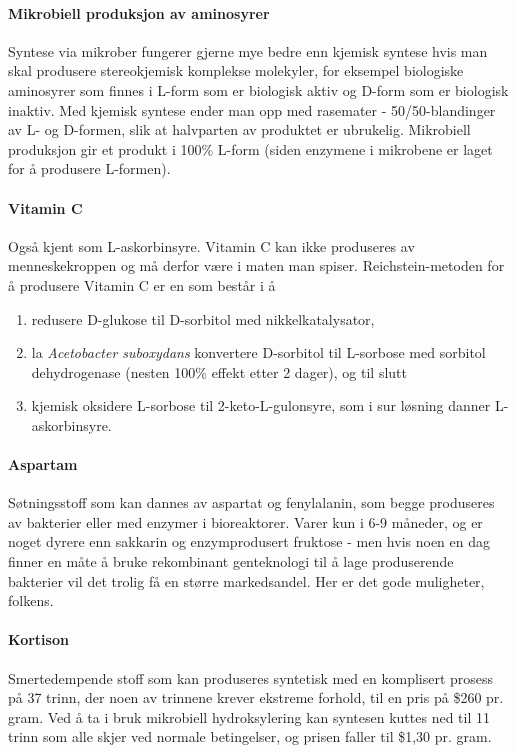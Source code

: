\paragraph{Mikrobiell produksjon av aminosyrer} Syntese via mikrober fungerer gjerne mye bedre enn kjemisk syntese hvis man skal produsere stereokjemisk komplekse molekyler, for eksempel biologiske aminosyrer som finnes i L-form som er biologisk aktiv og D-form som er biologisk inaktiv. Med kjemisk syntese ender man opp med rasemater - 50/50-blandinger av L- og D-formen, slik at halvparten av produktet er ubrukelig. Mikrobiell produksjon gir et produkt i 100\% L-form (siden enzymene i mikrobene er laget for å produsere L-formen).

\paragraph{Vitamin C} Også kjent som L-askorbinsyre. Vitamin C kan ikke produseres av menneskekroppen og må derfor være i maten man spiser. Reichstein-metoden for å produsere Vitamin C er en  som består i å 
\begin{enumerate}
	\item redusere D-glukose til D-sorbitol med nikkelkatalysator,
	\item la \emph{Acetobacter suboxydans} konvertere D-sorbitol til L-sorbose med sorbitol dehydrogenase (nesten 100\% effekt etter 2 dager), og til slutt
	\item kjemisk oksidere L-sorbose til 2-keto-L-gulonsyre, som i sur løsning danner L-askorbinsyre.
\end{enumerate}

\paragraph{Aspartam} Søtningsstoff som kan dannes av aspartat og fenylalanin, som begge produseres av bakterier eller med enzymer i bioreaktorer. Varer kun i 6-9 måneder, og er noget dyrere enn sakkarin og enzymprodusert fruktose - men hvis noen en dag finner en måte å bruke rekombinant genteknologi til å lage produserende bakterier vil det trolig få en større markedsandel. Her er det gode muligheter, folkens.

\paragraph{Kortison} Smertedempende stoff som kan produseres syntetisk med en komplisert prosess på 37 trinn, der noen av trinnene krever ekstreme forhold, til en pris på \$260 pr. gram. Ved å ta i bruk mikrobiell hydroksylering kan syntesen kuttes ned til 11 trinn som alle skjer ved normale betingelser, og prisen faller til \$1,30 pr. gram. 

